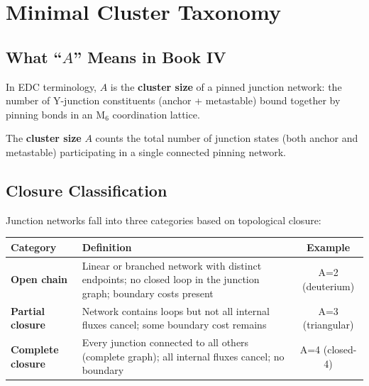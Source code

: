\section{Minimal Cluster Taxonomy}
\label{sec:light:taxonomy}

\subsection{What ``$A$'' Means in Book IV}

In EDC terminology, $A$ is the \textbf{cluster size} of a pinned junction network:
the number of Y-junction constituents (anchor + metastable) bound together by
pinning bonds in an M$_6$ coordination lattice.

\begin{definition}
    The \textbf{cluster size} $A$ counts the total number of junction states
    (both anchor and metastable) participating in a single connected pinning
    network.
\end{definition}

\subsection{Closure Classification}

Junction networks fall into three categories based on topological closure:

\begin{center}
\begin{tabular}{lp{8cm}c}
    \toprule
    Category & Definition & Example \\
    \midrule
    \textbf{Open chain} &
    Linear or branched network with distinct endpoints; no closed loop
    in the junction graph; boundary costs present &
    A=2 (deuterium) \\
    \textbf{Partial closure} &
    Network contains loops but not all internal fluxes cancel;
    some boundary cost remains &
    A=3 (triangular) \\
    \textbf{Complete closure} &
    Every junction connected to all others (complete graph);
    all internal fluxes cancel; no boundary &
    A=4 (closed-4) \\
    \bottomrule
\end{tabular}
\end{center}

